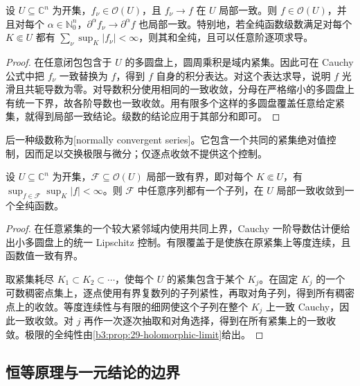\begin{proposition}[全纯函数的局部一致极限]\label{b3:prop:29-holomorphic-limit}
设 \(U\subseteq\mathbb C^n\) 为开集，\(f_\nu\in\mathcal O(U)\)，且 \(f_\nu\to f\) 在 \(U\) 局部一致。则 \(f\in\mathcal O(U)\)，并且对每个 \(\alpha\in\mathbb N_0^n\)，\(\partial^\alpha f_\nu\to\partial^\alpha f\) 也局部一致。特别地，若全纯函数级数满足对每个 \(K\Subset U\) 都有 \(\sum_\nu\sup_K|f_\nu|<\infty\)，则其和全纯，且可以任意阶逐项求导。
\end{proposition}
\begin{proof}
在任意闭包包含于 \(U\) 的多圆盘上，圆周乘积是域内紧集。因此可在 Cauchy 公式中把 \(f_\nu\) 一致替换为 \(f\)，得到 \(f\) 自身的积分表达。对这个表达求导，说明 \(f\) 光滑且共轭导数为零。对导数积分使用相同的一致收敛，分母在严格缩小的多圆盘上有统一下界，故各阶导数也一致收敛。用有限多个这样的多圆盘覆盖任意给定紧集，就得到局部一致结论。级数的结论应用于其部分和即可。
\end{proof}

后一种级数称为[normally convergent series]。它包含一个共同的紧集绝对值控制，因而足以交换极限与微分；仅逐点收敛不提供这个控制。

\begin{theorem}\label{b3:thm:29-montel}
设 \(U\subseteq\mathbb C^n\) 为开集，\(\mathcal F\subseteq\mathcal O(U)\) 局部一致有界，即对每个 \(K\Subset U\)，有 \(\sup_{f\in\mathcal F}\sup_K|f|<\infty\)。则 \(\mathcal F\) 中任意序列都有一个子列，在 \(U\) 局部一致收敛到一个全纯函数。
\end{theorem}
\begin{proof}
在任意紧集的一个较大紧邻域内使用共同上界，Cauchy 一阶导数估计便给出小多圆盘上的统一 Lipschitz 控制。有限覆盖于是使族在原紧集上等度连续，且函数值一致有界。

取紧集耗尽 \(K_1\subset K_2\subset\cdots\)，使每个 \(U\) 的紧集包含于某个 \(K_j\)。在固定 \(K_j\) 的一个可数稠密点集上，逐点使用有界复数列的子列紧性，再取对角子列，得到所有稠密点上的收敛。等度连续性与有限的细网使这个子列在整个 \(K_j\) 上一致 Cauchy，因此一致收敛。对 \(j\) 再作一次逐次抽取和对角选择，得到在所有紧集上的一致收敛。极限的全纯性由\cref{b3:prop:29-holomorphic-limit}给出。
\end{proof}

\subsection{恒等原理与一元结论的边界}
\label{b3:subsec:290104}

